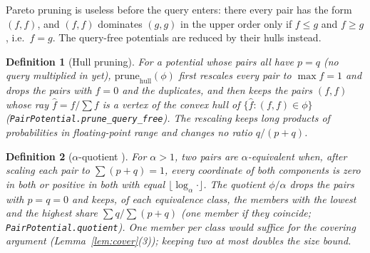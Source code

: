 \documentclass{article} %
\newtheorem{definition}{Definition}
\newcommand{\prune}{\mathrm{prune}}
\begin{document}
Pareto pruning is useless before the query enters: there every pair has the form $(f,f)$,
and $(f,f)$ dominates $(g,g)$ in the upper order only if $f\le g$ and $f\ge g$, i.e.\
$f=g$. The query-free potentials are reduced by their hulls instead.

\begin{definition}[Hull pruning]\label{def:hullprune}
For a potential whose pairs all have $p=q$ (no query multiplied in yet),
$\prune_{\mathrm{hull}}(\phi)$ first rescales every pair to $\max f=1$ and drops the pairs
with $f=0$ and the duplicates, and then keeps the pairs $(f,f)$ whose ray
$\hat f=f/\sum f$ is a vertex of the convex hull of $\{\hat f : (f,f)\in\phi\}$
(\texttt{PairPotential.prune\_query\_free}). The rescaling keeps long products of
probabilities in floating-point range and changes no ratio $q/(p+q)$.
\end{definition}

\begin{definition}[$\alpha$-quotient \citep{maua2012ijar}]\label{def:quotient}
For $\alpha>1$, two pairs are \emph{$\alpha$-equivalent} when, after scaling each
pair to $\sum(p+q)=1$, every coordinate of both components is zero in both or
positive in both with equal $\lfloor\log_\alpha\cdot\rfloor$. The quotient
$\phi/\alpha$ drops the pairs with $p=q=0$ and keeps, of each equivalence class, the
members with the lowest and the highest share $\sum q/\sum(p+q)$ (one member if they
coincide; \texttt{PairPotential.quotient}). One member per class would suffice for the
covering argument (Lemma~\ref{lem:cover}(3)); keeping two at most doubles the size bound.
\end{definition}
\end{document}
